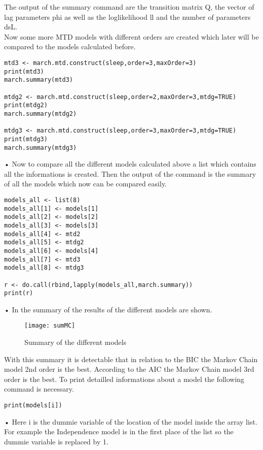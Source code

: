 The output of the summary command are the transition matrix Q, the vector of lag parameters phi as well as the loglikelihood ll and the number of parameters dsL.\\ Now some more MTD models with different orders are created which later will be compared to the models calculated before. 
\begin{verbatim}
mtd3 <- march.mtd.construct(sleep,order=3,maxOrder=3)
print(mtd3)
march.summary(mtd3)

mtdg2 <- march.mtd.construct(sleep,order=2,maxOrder=3,mtdg=TRUE)
print(mtdg2)
march.summary(mtdg2)

mtdg3 <- march.mtd.construct(sleep,order=3,maxOrder=3,mtdg=TRUE)
print(mtdg3)
march.summary(mtdg3)
\end{verbatim}•
Now to compare all the different models calculated above a list which contains all the informations is created. Then the output of the command is the summary of all the models which now can be compared easily. 
\begin{verbatim}
models_all <- list(8)
models_all[1] <- models[1]
models_all[2] <- models[2]
models_all[3] <- models[3]
models_all[4] <- mtd2
models_all[5] <- mtdg2
models_all[6] <- models[4]
models_all[7] <- mtd3
models_all[8] <- mtdg3

r <- do.call(rbind,lapply(models_all,march.summary))
print(r)
\end{verbatim}•
In  the summary of the results of the different models are shown. 
\begin{figure}[h]
    \centering
    \texttt{[image: sumMC]}
    \caption{Summary of the different models}
    \label{fig:sumMC}
\end{figure}
With this summary it is detectable that in relation to the BIC the Markov Chain model 2nd order is the best. According to the AIC the Markov Chain model 3rd order is the best. To print detailled informations about a model the following command is necessary.
\begin{verbatim}
print(models[i])
\end{verbatim}•
Here i is the dummie variable of the location of the model inside the array list. For example the Independence model is in the first place of the list so the dummie variable is replaced by 1. 

